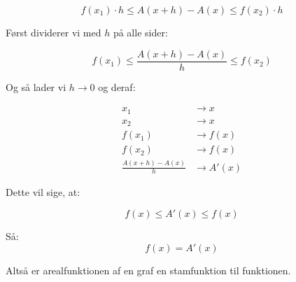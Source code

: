 \begin{proofw}
$$
    f(x_1) \cdot h \leq A(x+h)-A(x)
    \leq f(x_2) \cdot h
$$

Først dividerer vi med $h$ på alle sider:

$$
    f(x_1) \leq \frac{A(x+h)-A(x)}{h} \leq f(x_2)
$$

Og så lader vi $h \rightarrow 0$ og deraf:

\begin{align*}
    x_1 &\rightarrow x \\
    x_2 &\rightarrow x \\
    f(x_1) &\rightarrow f(x) \\
    f(x_2) &\rightarrow f(x) \\
    \frac{A(x+h)-A(x)}{h} &\rightarrow A'(x)
\end{align*}

Dette vil sige, at:

$$
    f(x) \leq A'(x) \leq f(x)
$$

Så:
$$
    f(x) = A'(x)
$$

Altså er arealfunktionen af en graf en stamfunktion til funktionen.

\end{proofw}
